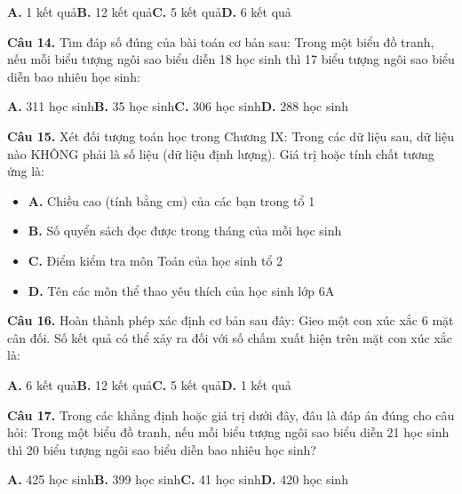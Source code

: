 \documentclass[11pt,a4paper]{article}
\begin{document}
\hspace*{1.5em}\textbf{A.} 1 kết quả\quad\quad \textbf{B.} 12 kết quả\quad\quad \textbf{C.} 5 kết quả\quad\quad \textbf{D.} 6 kết quả\par\vspace{2pt}
\textbf{\color{primary} Câu 14.} Tìm đáp số đúng của bài toán cơ bản sau: Trong một biểu đồ tranh, nếu mỗi biểu tượng ngôi sao biểu diễn 18 học sinh thì 17 biểu tượng ngôi sao biểu diễn bao nhiêu học sinh:\par
\hspace*{1.5em}\textbf{A.} 311 học sinh\quad\quad \textbf{B.} 35 học sinh\quad\quad \textbf{C.} 306 học sinh\quad\quad \textbf{D.} 288 học sinh\par\vspace{2pt}
\textbf{\color{primary} Câu 15.} Xét đối tượng toán học trong Chương IX: Trong các dữ liệu sau, dữ liệu nào KHÔNG phải là số liệu (dữ liệu định lượng). Giá trị hoặc tính chất tương ứng là:\par
\begin{itemize}\setlength{\itemsep}{1pt}\setlength{\parskip}{0pt}
  \item[] \textbf{A.} Chiều cao (tính bằng cm) của các bạn trong tổ 1
  \item[] \textbf{B.} Số quyển sách đọc được trong tháng của mỗi học sinh
  \item[] \textbf{C.} Điểm kiểm tra môn Toán của học sinh tổ 2
  \item[] \textbf{D.} Tên các môn thể thao yêu thích của học sinh lớp 6A
\end{itemize}\vspace{2pt}
\textbf{\color{primary} Câu 16.} Hoàn thành phép xác định cơ bản sau đây: Gieo một con xúc xắc 6 mặt cân đối. Số kết quả có thể xảy ra đối với số chấm xuất hiện trên mặt con xúc xắc là:\par
\hspace*{1.5em}\textbf{A.} 6 kết quả\quad\quad \textbf{B.} 12 kết quả\quad\quad \textbf{C.} 5 kết quả\quad\quad \textbf{D.} 1 kết quả\par\vspace{2pt}
\textbf{\color{primary} Câu 17.} Trong các khẳng định hoặc giá trị dưới đây, đâu là đáp án đúng cho câu hỏi: Trong một biểu đồ tranh, nếu mỗi biểu tượng ngôi sao biểu diễn 21 học sinh thì 20 biểu tượng ngôi sao biểu diễn bao nhiêu học sinh?\par
\hspace*{1.5em}\textbf{A.} 425 học sinh\quad\quad \textbf{B.} 399 học sinh\quad\quad \textbf{C.} 41 học sinh\quad\quad \textbf{D.} 420 học sinh\par\vspace{2pt}
\end{document}

